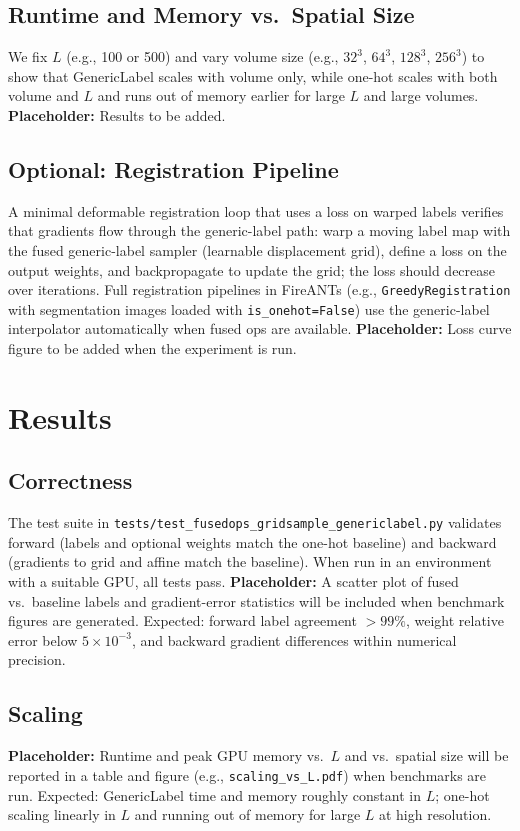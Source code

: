 \documentclass[11pt]{article}
\begin{document}
\subsection{Runtime and Memory vs.\ Spatial Size}
We fix $L$ (e.g., 100 or 500) and vary volume size (e.g., $32^3$, $64^3$, $128^3$, $256^3$) to show that GenericLabel scales with volume only, while one-hot scales with both volume and $L$ and runs out of memory earlier for large $L$ and large volumes. \textbf{Placeholder:} Results to be added.

\subsection{Optional: Registration Pipeline}
A minimal deformable registration loop that uses a loss on warped labels verifies that gradients flow through the generic-label path: warp a moving label map with the fused generic-label sampler (learnable displacement grid), define a loss on the output weights, and backpropagate to update the grid; the loss should decrease over iterations. Full registration pipelines in FireANTs (e.g., \texttt{GreedyRegistration} with segmentation images loaded with \texttt{is\_onehot=False}) use the generic-label interpolator automatically when fused ops are available. \textbf{Placeholder:} Loss curve figure to be added when the experiment is run.

\section{Results}
\label{sec:results}

\subsection{Correctness}
The test suite in \texttt{tests/test\_fusedops\_gridsample\_genericlabel.py} validates forward (labels and optional weights match the one-hot baseline) and backward (gradients to grid and affine match the baseline). When run in an environment with a suitable GPU, all tests pass. \textbf{Placeholder:} A scatter plot of fused vs.\ baseline labels and gradient-error statistics will be included when benchmark figures are generated. Expected: forward label agreement $>99\%$, weight relative error below $5\times10^{-3}$, and backward gradient differences within numerical precision.

\subsection{Scaling}
\textbf{Placeholder:} Runtime and peak GPU memory vs.\ $L$ and vs.\ spatial size will be reported in a table and figure (e.g., \texttt{scaling\_vs\_L.pdf}) when benchmarks are run. Expected: GenericLabel time and memory roughly constant in $L$; one-hot scaling linearly in $L$ and running out of memory for large $L$ at high resolution.
\end{document}
